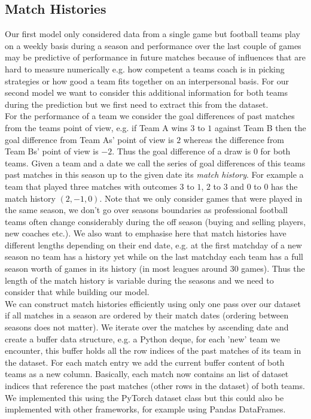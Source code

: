 \documentclass[a4paper]{article}
\begin{document}
\subsection{Match Histories}
Our first model only considered data from a single game but football teams play on a weekly basis during a season and performance over the last couple of games may be predictive of performance in future matches because of influences that are hard to measure numerically e.g. how competent a teams coach is in picking strategies or how good a team fits together on an interpersonal basis. For our second model we want to consider this additional information for both teams during the prediction but we first need to extract this from the dataset. \\
For the performance of a team we consider the goal differences of past matches from the teams point of view, e.g. if Team A wins $3$ to $1$ against Team B then the goal difference from Team As' point of view is $2$ whereas the difference from Team Bs' point of view is $-2$. Thus the goal difference of a draw is $0$ for both teams. Given a team and a date we call the series of goal differences of this teams past matches in this season up to the given date its \textit{match history}. For example a team that played three matches with outcomes $3$ to $1$, $2$ to $3$ and $0$ to $0$ has the match history $(2, -1, 0)$. Note that we only consider games that were played in the same season, we don't go over seasons boundaries as professional football teams often change considerably during the off season (buying and selling players, new coaches etc.). We also want to emphasise here that match histories have different lengths depending on their end date, e.g. at the first matchday of a new season no team has a history yet while on the last matchday each team has a full season worth of games in its history (in most leagues around $30$ games). Thus the length of the match history is variable during the seasons and we need to consider that while building our model. \\
We can construct match histories efficiently using only one pass over our dataset if all matches in a season are ordered by their match dates (ordering between seasons does not matter). We iterate over the matches by ascending date and create a buffer data structure, e.g. a Python deque,  for each 'new' team we encounter, this buffer holds all the row indices of the past matches of its team in the dataset. For each match entry we add the current buffer content of both teams as a new column. Basically, each match now contains an list of dataset indices that reference the past matches (other rows in the dataset) of both teams. We implemented this using the PyTorch dataset class but this could also be implemented with other frameworks, for example using Pandas DataFrames.
\end{document}
